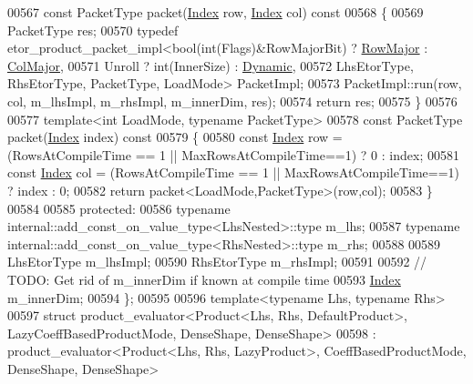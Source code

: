 \begin{DoxyCode}
00567   \textcolor{keyword}{const} PacketType packet(\hyperlink{namespace_eigen_a62e77e0933482dafde8fe197d9a2cfde}{Index} row, \hyperlink{namespace_eigen_a62e77e0933482dafde8fe197d9a2cfde}{Index} col)\textcolor{keyword}{ const}
00568 \textcolor{keyword}{  }\{
00569     PacketType res;
00570     \textcolor{keyword}{typedef} etor\_product\_packet\_impl<bool(\textcolor{keywordtype}{int}(Flags)&RowMajorBit) ? \hyperlink{group__enums_ggaacded1a18ae58b0f554751f6cdf9eb13acfcde9cd8677c5f7caf6bd603666aae3}{RowMajor} : 
      \hyperlink{group__enums_ggaacded1a18ae58b0f554751f6cdf9eb13a0cbd4bdd0abcfc0224c5fcb5e4f6669a}{ColMajor},
00571                                      Unroll ? int(InnerSize) : \hyperlink{namespace_eigen_ad81fa7195215a0ce30017dfac309f0b2}{Dynamic},
00572                                      LhsEtorType, RhsEtorType, PacketType, LoadMode> PacketImpl;
00573     PacketImpl::run(row, col, m\_lhsImpl, m\_rhsImpl, m\_innerDim, res);
00574     \textcolor{keywordflow}{return} res;
00575   \}
00576 
00577   \textcolor{keyword}{template}<\textcolor{keywordtype}{int} LoadMode, \textcolor{keyword}{typename} PacketType>
00578   \textcolor{keyword}{const} PacketType packet(\hyperlink{namespace_eigen_a62e77e0933482dafde8fe197d9a2cfde}{Index} index)\textcolor{keyword}{ const}
00579 \textcolor{keyword}{  }\{
00580     \textcolor{keyword}{const} \hyperlink{namespace_eigen_a62e77e0933482dafde8fe197d9a2cfde}{Index} row = (RowsAtCompileTime == 1 || MaxRowsAtCompileTime==1) ? 0 : index;
00581     \textcolor{keyword}{const} \hyperlink{namespace_eigen_a62e77e0933482dafde8fe197d9a2cfde}{Index} col = (RowsAtCompileTime == 1 || MaxRowsAtCompileTime==1) ? index : 0;
00582     \textcolor{keywordflow}{return} packet<LoadMode,PacketType>(row,col);
00583   \}
00584 
00585 \textcolor{keyword}{protected}:
00586   \textcolor{keyword}{typename} internal::add\_const\_on\_value\_type<LhsNested>::type m\_lhs;
00587   \textcolor{keyword}{typename} internal::add\_const\_on\_value\_type<RhsNested>::type m\_rhs;
00588   
00589   LhsEtorType m\_lhsImpl;
00590   RhsEtorType m\_rhsImpl;
00591 
00592   \textcolor{comment}{// TODO: Get rid of m\_innerDim if known at compile time}
00593   \hyperlink{namespace_eigen_a62e77e0933482dafde8fe197d9a2cfde}{Index} m\_innerDim;
00594 \};
00595 
00596 \textcolor{keyword}{template}<\textcolor{keyword}{typename} Lhs, \textcolor{keyword}{typename} Rhs>
00597 \textcolor{keyword}{struct }product\_evaluator<Product<Lhs, Rhs, DefaultProduct>, LazyCoeffBasedProductMode, DenseShape, 
      DenseShape>
00598   : product\_evaluator<Product<Lhs, Rhs, LazyProduct>, CoeffBasedProductMode, DenseShape, DenseShape>

\end{DoxyCode}
